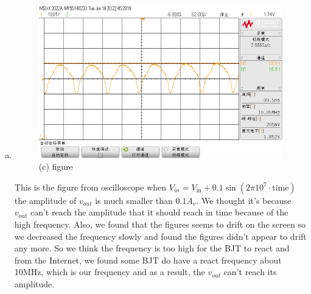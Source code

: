 \documentclass[12pt]{article}
\begin{document}
\begin{enumerate}[(a)]
\item
\begin{figure}[H]
\centering
\includegraphics[scale=0.5]{P4.png}
\caption{(c) figure}
\end{figure}
This is the figure from oscilloscope when $V_{in}=V_{\textrm{in}}+0.1\sin(2\pi10^7\cdot \textrm{time})$ the amplitude of $v_{out}$ is much smaller than $0.1A_v$. We thought it's because $v_{out}$ can't reach the amplitude that it should reach in time because of the high frequency. Also, we found that the figures seems to drift on the screen so we decreased the frequency slowly and found the figures didn't appear to drift any more. So we think the frequency is too high for the BJT to react and from the Internet, we found some BJT do have a react frequency about 10MHz, which is our frequency and as a result, the $v_{out}$ can't reach its amplitude.
\end{enumerate}
\end{document}
